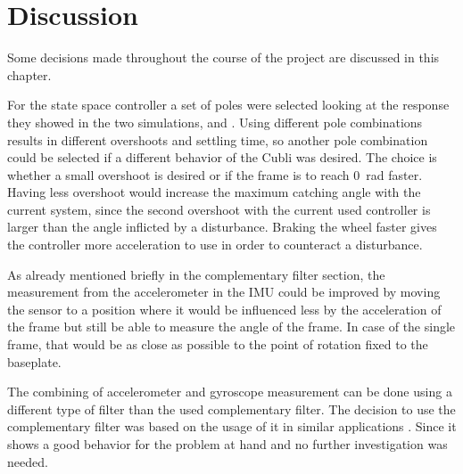 \chapter{Discussion}
Some decisions made throughout the course of the project are discussed in this chapter. 

For the state space controller a set of poles were selected looking at the response they showed in the two simulations,  and . Using different pole combinations results in different overshoots and settling time, so another pole combination could be selected if a different behavior of the Cubli was desired. 
The choice is whether a small overshoot is desired or if the frame is to reach \SI{0}{rad} faster. 
Having less overshoot would increase the maximum catching angle with the current system, since the second overshoot with the current used controller is larger than the angle inflicted by a disturbance. 
Braking the wheel faster gives the controller more acceleration to use in order to counteract a disturbance. 

As already mentioned briefly in the complementary filter section, the measurement from the accelerometer in the IMU could be improved by moving the sensor to a position where it would be influenced less by the acceleration of the frame but still be able to measure the angle of the frame. In case of the single frame, that would be as close as possible to the point of rotation fixed to the baseplate.

The combining of accelerometer and gyroscope measurement can be done using a different type of filter than the used complementary filter. The decision to use the complementary filter was based on the usage of it in similar applications \cite{OlliW}. Since it shows a good behavior for the problem at hand and no further investigation was needed.

%

